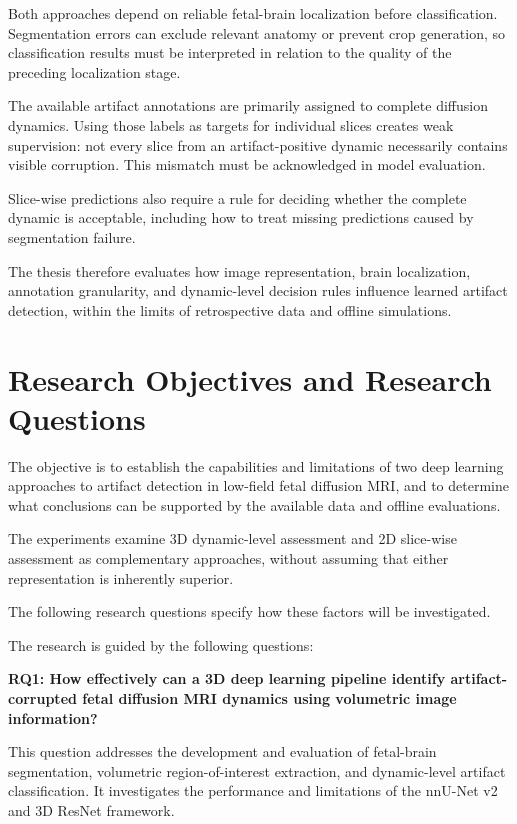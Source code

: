 Both approaches depend on reliable fetal-brain localization before classification. Segmentation errors can exclude relevant anatomy or prevent crop generation, so classification results must be interpreted in relation to the quality of the preceding localization stage.

The available artifact annotations are primarily assigned to complete diffusion dynamics. Using those labels as targets for individual slices creates weak supervision: not every slice from an artifact-positive dynamic necessarily contains visible corruption. This mismatch must be acknowledged in model evaluation.

Slice-wise predictions also require a rule for deciding whether the complete dynamic is acceptable, including how to treat missing predictions caused by segmentation failure.

The thesis therefore evaluates how image representation, brain localization, annotation granularity, and dynamic-level decision rules influence learned artifact detection, within the limits of retrospective data and offline simulations.

\section{Research Objectives and Research Questions}

The objective is to establish the capabilities and limitations of two deep learning approaches to artifact detection in low-field fetal diffusion MRI, and to determine what conclusions can be supported by the available data and offline evaluations.

The experiments examine 3D dynamic-level assessment and 2D slice-wise assessment as complementary approaches, without assuming that either representation is inherently superior.

The following research questions specify how these factors will be investigated.

The research is guided by the following questions:

\noindent\textbf{RQ1: How effectively can a 3D deep learning pipeline identify artifact-corrupted fetal diffusion MRI dynamics using volumetric image information?}

This question addresses the development and evaluation of fetal-brain segmentation, volumetric region-of-interest extraction, and dynamic-level artifact classification. It investigates the performance and limitations of the nnU-Net v2 and 3D ResNet framework.

